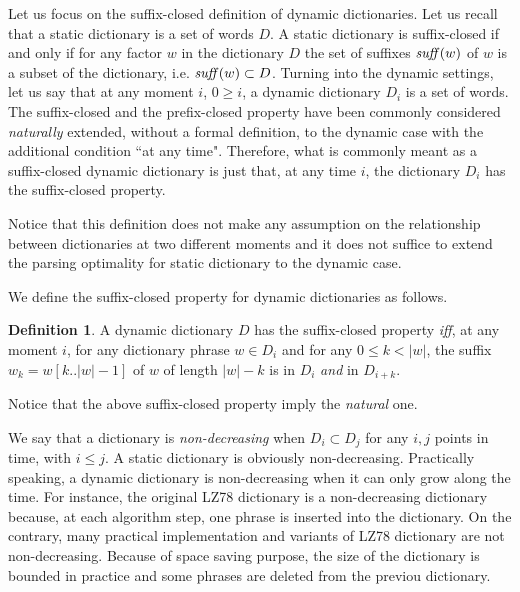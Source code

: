 \documentclass[12pt]{article}
\theoremstyle{plain}
\theoremstyle{definition}
\newtheorem{definition}{Definition}[section]
\theoremstyle{remark}
\begin{document}
Let us focus on the suffix-closed definition of dynamic dictionaries.
Let us recall that a static dictionary is a set of words $D$.
A static dictionary is suffix-closed if and only if for any factor $w$ in the dictionary $D$ the set of suffixes $\mbox{\emph{suff}}(w)$ of $w$ is a subset of the dictionary, i.e. $\mbox{\emph{suff}}(w)\subset D$.
Turning into the dynamic settings, let us say that 
at any moment $i$, $0\geq i$,
a dynamic dictionary $D_i$ is a set of words.
The suffix-closed and the prefix-closed property have been commonly considered \emph{naturally} extended, without a formal definition, to the dynamic case with the additional condition ``at any time".
Therefore, what is commonly meant as a suffix-closed dynamic dictionary is just that, at any time $i$, the dictionary $D_i$ has the suffix-closed property.

Notice that this definition does not make any assumption on the relationship between dictionaries at two different moments and it does not suffice to extend the parsing optimality for static dictionary to the dynamic case.

We define the suffix-closed property for dynamic dictionaries as follows.



\begin{definition} \label{prp:dynsufclosed}
A dynamic dictionary $D$ has the suffix-closed property \textit{iff}, at any moment $i$,
for any dictionary phrase $w\in D_i$ and 
for any $0 \leq k < |w|$, 
the suffix $w_k=w[k..|w|-1]$ of $w$ of length $|w|-k$ 
is in $D_{i}$ \emph{and} in $D_{i+k}$.\end{definition}

Notice that the above suffix-closed property imply the \emph{natural} one.



We say that a dictionary is \textit{non-decreasing} when $D_i\subset D_j$ for any $i,j$ points in time, with $i \leq j$. A static dictionary is obviously non-decreasing. Practically speaking, a dynamic dictionary is non-decreasing when it can only grow along the time. 
For instance, the original LZ78 dictionary is a non-decreasing dictionary because, at each algorithm step, one phrase is inserted into the dictionary. On the contrary, 
many practical implementation and variants of LZ78 dictionary are not non-decreasing. Because of space saving purpose, the size of the dictionary is bounded in practice and some phrases are deleted from the previou dictionary. 
\end{document}
